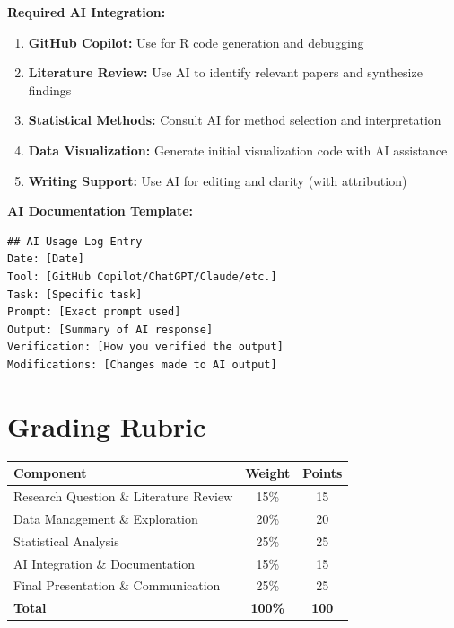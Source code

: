 \documentclass[11pt]{article}
\begin{document}
\begin{tcolorbox}[colback=aiblue!5,colframe=aiblue,boxrule=1pt,arc=2pt,left=6pt,right=6pt,top=6pt,bottom=6pt]
\textbf{Required AI Integration:}
\begin{enumerate}
\item \textbf{GitHub Copilot:} Use for R code generation and debugging
\item \textbf{Literature Review:} Use AI to identify relevant papers and synthesize findings
\item \textbf{Statistical Methods:} Consult AI for method selection and interpretation
\item \textbf{Data Visualization:} Generate initial visualization code with AI assistance
\item \textbf{Writing Support:} Use AI for editing and clarity (with attribution)
\end{enumerate}

\textbf{AI Documentation Template:}
\begin{verbatim}
## AI Usage Log Entry
Date: [Date]
Tool: [GitHub Copilot/ChatGPT/Claude/etc.]
Task: [Specific task]
Prompt: [Exact prompt used]
Output: [Summary of AI response]
Verification: [How you verified the output]
Modifications: [Changes made to AI output]
\end{verbatim}
\end{tcolorbox}

\section{Grading Rubric}

\begin{center}
\begin{tabular}{lcc}
\toprule
\textbf{Component} & \textbf{Weight} & \textbf{Points} \\
\midrule
Research Question \& Literature Review & 15\% & 15 \\
Data Management \& Exploration & 20\% & 20 \\
Statistical Analysis & 25\% & 25 \\
AI Integration \& Documentation & 15\% & 15 \\
Final Presentation \& Communication & 25\% & 25 \\
\midrule
\textbf{Total} & \textbf{100\%} & \textbf{100} \\
\bottomrule
\end{tabular}
\end{center}
\end{document}
